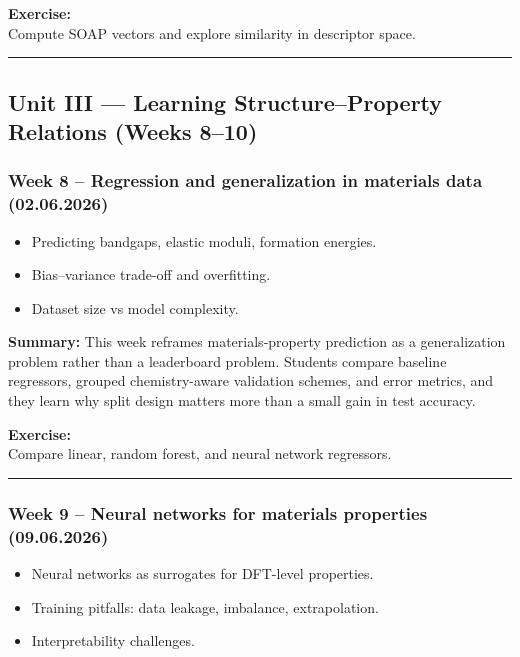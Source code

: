 \documentclass[
]{agujournal2019}
\providecommand{\tightlist}{%
  \setlength{\itemsep}{0pt}\setlength{\parskip}{0pt}}
\begin{document}
\textbf{Exercise:}\\
Compute SOAP vectors and explore similarity in descriptor space.

\begin{center}\rule{0.5\linewidth}{0.5pt}\end{center}

\subsection{Unit III --- Learning Structure--Property Relations (Weeks
8--10)}\label{unit-iii-learning-structureproperty-relations-weeks-810}

\subsubsection{Week 8 -- Regression and generalization in materials data
(02.06.2026)}\label{week-8-regression-and-generalization-in-materials-data-02.06.2026}

\begin{itemize}
\tightlist
\item
  Predicting bandgaps, elastic moduli, formation energies.
\item
  Bias--variance trade-off and overfitting.
\item
  Dataset size vs model complexity.
\end{itemize}

\textbf{Summary:} This week reframes materials-property prediction as a
generalization problem rather than a leaderboard problem. Students
compare baseline regressors, grouped chemistry-aware validation schemes,
and error metrics, and they learn why split design matters more than a
small gain in test accuracy.

\textbf{Exercise:}\\
Compare linear, random forest, and neural network regressors.

\begin{center}\rule{0.5\linewidth}{0.5pt}\end{center}

\subsubsection{Week 9 -- Neural networks for materials properties
(09.06.2026)}\label{week-9-neural-networks-for-materials-properties-09.06.2026}

\begin{itemize}
\tightlist
\item
  Neural networks as surrogates for DFT-level properties.
\item
  Training pitfalls: data leakage, imbalance, extrapolation.
\item
  Interpretability challenges.
\end{itemize}
\end{document}

